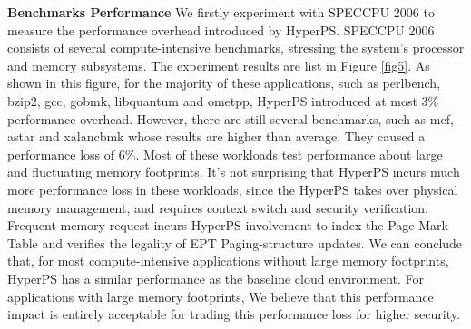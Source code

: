 \textbf{Benchmarks Performance}
We firstly experiment with SPECCPU 2006 to measure the performance overhead introduced by HyperPS.
SPECCPU 2006 consists of several compute-intensive benchmarks, stressing the system's processor and memory subsystems. 
The experiment results are list in Figure \ref{fig5}. As shown in this figure, for the majority of these applications, such as perlbench, bzip2, gcc, gobmk, libquantum and ometpp, 
HyperPS introduced at most 3\% performance overhead. 
However, there are still several benchmarks, such as mcf, astar and xalancbmk whose results are higher than average. 
They caused a performance loss of 6\%. 
Most of these workloads test performance about large and fluctuating memory footprints. 
It's not surprising that HyperPS incurs much more performance loss in these workloads, since the HyperPS takes over physical memory management, and requires context switch and security verification. Frequent memory request incurs HyperPS involvement to index the Page-Mark Table and verifies the legality of EPT Paging-structure updates.
We can conclude that, for most compute-intensive applications without large memory footprints, HyperPS has a similar performance as the baseline cloud environment. 
For applications with large memory footprints, 
We believe that this performance impact is entirely acceptable for trading this performance loss for higher security.



